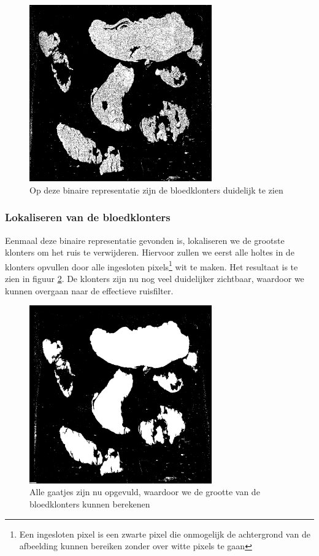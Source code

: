 \documentclass[a4paper,kulak]{kulakarticle}
\begin{document}
	\begin{figure}[H]
	\centering
	\includegraphics[width=0.7\textwidth]{grijswaarden_bin_vb}
	\caption{Op deze binaire representatie zijn de bloedklonters duidelijk te zien}
	\label{figuur foto_bin}
	\end{figure}

	\subsubsection{Lokaliseren van de bloedklonters}
		Eenmaal deze binaire representatie gevonden is, lokaliseren we de grootste klonters om het ruis te verwijderen. Hiervoor zullen we eerst alle holtes in de klonters opvullen door alle ingesloten pixels\footnote{Een ingesloten pixel is een zwarte pixel die onmogelijk de achtergrond van de afbeelding kunnen bereiken zonder over witte pixels te gaan} wit te maken. Het resultaat is te zien in figuur \ref{figuur lok_bloed}. De klonters zijn nu nog veel duidelijker zichtbaar, waardoor we kunnen overgaan naar de effectieve ruisfilter.

	\begin{figure}[H]
	\centering
	\includegraphics[width = 0.7\textwidth]{grijswaarden_bin_gevuld_vb}
	\caption{Alle gaatjes zijn nu opgevuld, waardoor we de grootte van de bloedklonters kunnen berekenen}
	\label{figuur lok_bloed}
	\end{figure}
\end{document}
